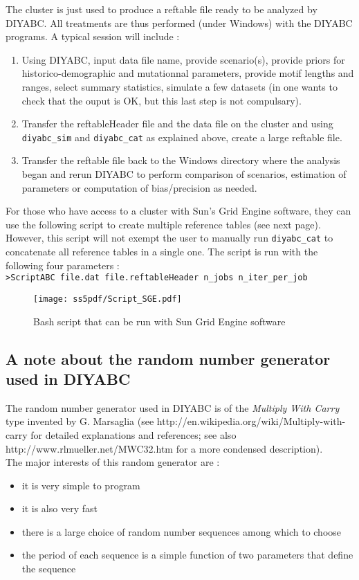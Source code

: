   The cluster is just used to produce a reftable file ready to be analyzed by DIYABC. All treatments are thus performed (under Windows) with the DIYABC programs. A typical session will include :\\
  \begin{enumerate}
  \item Using DIYABC, input data file name, provide scenario(s), provide priors for historico-demographic and mutationnal parameters, provide motif lengths and ranges, select summary statistics, simulate a few datasets (in one wants to check that the ouput is OK, but this last step is not compulsary). 
  \item Transfer the reftableHeader file and the data file on the cluster and using \texttt{diyabc\_sim} and \texttt{diyabc\_cat} as explained above, create a large reftable file.
  \item Transfer the reftable file back to the Windows directory where the analysis began and rerun DIYABC to perform comparison of scenarios, estimation of parameters or computation of bias/precision as needed.  
  \end{enumerate}
  For those who have access to a cluster with Sun's Grid Engine software, they can use the following script to create multiple reference tables (see next page). However, this script will not exempt the user to  manually run \texttt{diyabc\_cat} to concatenate all reference tables in a single one. The script is run with the following four parameters :\\
  
  \texttt{>ScriptABC file.dat file.reftableHeader n\_jobs n\_iter\_per\_job}
\clearpage
\begin{figure}
\caption{Bash script that can be run with Sun Grid Engine software}
\texttt{[image: ss5pdf/Script\_SGE.pdf]}
\end{figure}

\clearpage
\subsection{A note about the random number generator used in DIYABC}

The random number generator used in DIYABC is of the \emph{Multiply With Carry} type invented by G. Marsaglia (see http://en.wikipedia.org/wiki/Multiply-with-carry for detailed explanations and references; see also http://www.rlmueller.net/MWC32.htm for a more condensed description).\\
The major interests of this random generator are :
\begin{itemize}
\item  it is very simple to program 
\item it is also very fast
\item there is a large choice of random number sequences among which to choose
\item the period of each sequence is a simple function of two parameters that define the sequence
\end{itemize} 

